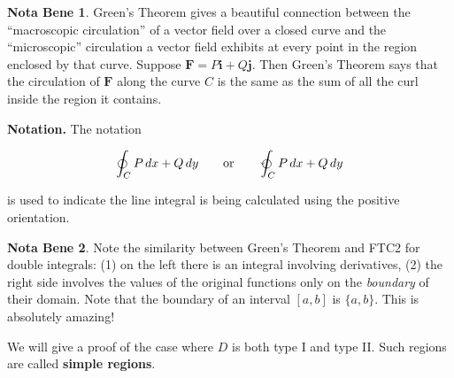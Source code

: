 \documentclass[11pt,oneside,english]{amsart}
\theoremstyle{definition}
\newtheorem*{note}{Nota Bene}
\newcommand{\ospace}{\hspace{7mm}\text{or}\hspace{7mm}}
\begin{document}
\begin{note}
Green's Theorem gives a beautiful connection between the ``macroscopic circulation'' of a vector field over a closed curve and the ``microscopic'' circulation a vector field exhibits at every point in the region enclosed by that curve. Suppose $\mathbf{F}=P\mathbf{i}+Q\mathbf{j}$. Then Green's Theorem says that the circulation of $\mathbf{F}$ along the curve $C$ is the same as the sum of all the curl inside the region it contains. 
\end{note}

\textbf{Notation.} The notation 

\[
\oint_CP\,dx+Q\,dy\ospace \varointctrclockwise_C P\,dx +Q\,dy
\]

is used to indicate the line integral is being calculated using the positive orientation.

\begin{note}
Note the similarity between Green's Theorem and FTC2 for double integrals: (1) on the left there is an integral involving derivatives, (2) the right side involves the values of the original functions only on the \textit{boundary} of their domain. Note that the boundary of an interval $[a,b]$ is $\{a,b\}$. This is absolutely amazing!
\end{note}

We will give a proof of the case where $D$ is both type I and type II. Such regions are called \textbf{simple regions}.
\end{document}
